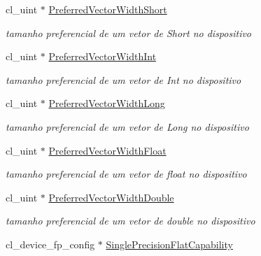 \begin{DoxyCompactItemize}
cl\+\_\+uint $\ast$ \hyperlink{structdevices_a8487ae555d79b9b78bbfd7b76e2f90d1}{Preferred\+Vector\+Width\+Short}
\begin{DoxyCompactList}\small\item\em tamanho preferencial de um vetor de Short no dispositivo \end{DoxyCompactList}\item 
\hypertarget{structdevices_a81160e33a03587e3694ae6ff69471643}{}\label{structdevices_a81160e33a03587e3694ae6ff69471643} 
cl\+\_\+uint $\ast$ \hyperlink{structdevices_a81160e33a03587e3694ae6ff69471643}{Preferred\+Vector\+Width\+Int}
\begin{DoxyCompactList}\small\item\em tamanho preferencial de um vetor de Int no dispositivo \end{DoxyCompactList}\item 
\hypertarget{structdevices_a4dc38a84c0b638f142cb5ba2b886b032}{}\label{structdevices_a4dc38a84c0b638f142cb5ba2b886b032} 
cl\+\_\+uint $\ast$ \hyperlink{structdevices_a4dc38a84c0b638f142cb5ba2b886b032}{Preferred\+Vector\+Width\+Long}
\begin{DoxyCompactList}\small\item\em tamanho preferencial de um vetor de Long no dispositivo \end{DoxyCompactList}\item 
\hypertarget{structdevices_a1b05f9cf6d0b49016bf48833ea3ff0e3}{}\label{structdevices_a1b05f9cf6d0b49016bf48833ea3ff0e3} 
cl\+\_\+uint $\ast$ \hyperlink{structdevices_a1b05f9cf6d0b49016bf48833ea3ff0e3}{Preferred\+Vector\+Width\+Float}
\begin{DoxyCompactList}\small\item\em tamanho preferencial de um vetor de float no dispositivo \end{DoxyCompactList}\item 
\hypertarget{structdevices_a36376e35408549d958ffce74baec74f9}{}\label{structdevices_a36376e35408549d958ffce74baec74f9} 
cl\+\_\+uint $\ast$ \hyperlink{structdevices_a36376e35408549d958ffce74baec74f9}{Preferred\+Vector\+Width\+Double}
\begin{DoxyCompactList}\small\item\em tamanho preferencial de um vetor de double no dispositivo \end{DoxyCompactList}\item 
\hypertarget{structdevices_af2485ecd861d278d13ea124342d95f36}{}\label{structdevices_af2485ecd861d278d13ea124342d95f36} 
cl\+\_\+device\+\_\+fp\+\_\+config $\ast$ \hyperlink{structdevices_af2485ecd861d278d13ea124342d95f36}{Single\+Precision\+Flat\+Capability}

\end{DoxyCompactItemize}
